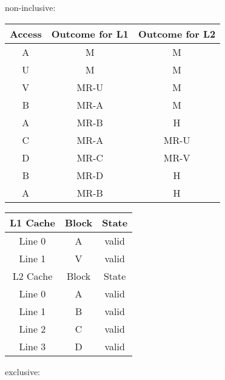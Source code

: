 \documentclass[12pt]{article}
\begin{document}
\begin{enumerate}
        non-inclusive:

        \begin{tabular}[ht!]{|c|c|c|} \hline
            Access  & Outcome for L1    & Outcome for L2    \\ \hline
            A       & M                 & M                 \\ \hline
            U       & M                 & M                 \\ \hline
            V       & MR-U              & M                 \\ \hline
            B       & MR-A              & M                 \\ \hline
            A       & MR-B              & H                 \\ \hline
            C       & MR-A              & MR-U              \\ \hline
            D       & MR-C              & MR-V              \\ \hline
            B       & MR-D              & H                 \\ \hline
            A       & MR-B              & H                 \\ \hline            
        \end{tabular}

        \begin{tabular}[ht!]{|c|c|c|} \hline
            L1 Cache    & Block & State     \\ \hline
            Line 0      & A     & valid     \\ \hline
            Line 1      & V     & valid     \\ \hline
            L2 Cache    & Block & State     \\ \hline
            Line 0      & A     & valid     \\ \hline
            Line 1      & B     & valid     \\ \hline
            Line 2      & C     & valid     \\ \hline
            Line 3      & D     & valid     \\ \hline
        \end{tabular}

        exclusive:


\end{enumerate}
\end{document}
